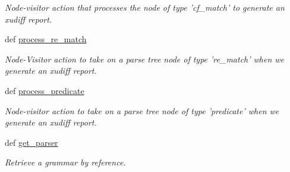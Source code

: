 \begin{DoxyCompactItemize}
\begin{DoxyCompactList}\small\item\em Node-\/visitor action that processes the node of type 'cf\-\_\-match' to generate an xudiff report. \end{DoxyCompactList}\item 
def \hyperlink{classxutools_1_1tools_1_1_x_u_diff_a9ad24f24b4d5dd5fbccb4e85d8d72c59}{process\-\_\-re\-\_\-match}
\begin{DoxyCompactList}\small\item\em Node-\/\-Visitor action to take on a parse tree node of type 're\-\_\-match' when we generate an xudiff report. \end{DoxyCompactList}\item 
def \hyperlink{classxutools_1_1tools_1_1_x_u_diff_aeae8f83ca57a6c0686e86bd863c19068}{process\-\_\-predicate}
\begin{DoxyCompactList}\small\item\em Node-\/visitor action to take on a parse tree node of type 'predicate' when we generate an xudiff report. \end{DoxyCompactList}\item 
def \hyperlink{classxutools_1_1tools_1_1_x_u_diff_a3728a1ca2768d8870dbf54f3e3e6fb85}{get\-\_\-parser}
\begin{DoxyCompactList}\small\item\em Retrieve a grammar by reference. \end{DoxyCompactList}\end{DoxyCompactItemize}
